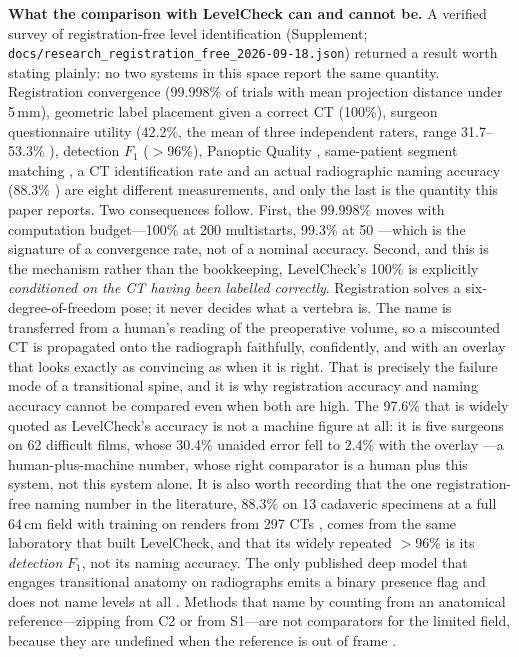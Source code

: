 \documentclass[11pt,letterpaper]{article}
\begin{document}
\textbf{What the comparison with LevelCheck can and cannot be.} A verified survey of registration-free level identification (Supplement; \texttt{docs/research\_registration\_free\_2026-09-18.json}) returned a result worth stating plainly: no two systems in this space report the same quantity. Registration convergence (99.998\% of trials with mean projection distance under 5\,mm), geometric label placement given a correct CT (100\%), surgeon questionnaire utility (42.2\%, the mean of three independent raters, range 31.7--53.3\% \citep{desilva2016}), detection $F_1$ ($>$96\%), Panoptic Quality \citep{vertxnet2024}, same-patient segment matching \citep{vdvm2023}, a CT identification rate \citep{spineclue2024} and an actual radiographic naming accuracy (88.3\% \citep{huang2022}) are eight different measurements, and only the last is the quantity this paper reports. Two consequences follow. First, the 99.998\% moves with computation budget---100\% at 200 multistarts, 99.3\% at 50 \citep{otake2015}---which is the signature of a convergence rate, not of a nominal accuracy. Second, and this is the mechanism rather than the bookkeeping, LevelCheck's 100\% is explicitly \emph{conditioned on the CT having been labelled correctly}. Registration solves a six-degree-of-freedom pose; it never decides what a vertebra is. The name is transferred from a human's reading of the preoperative volume, so a miscounted CT is propagated onto the radiograph faithfully, confidently, and with an overlay that looks exactly as convincing as when it is right. That is precisely the failure mode of a transitional spine, and it is why registration accuracy and naming accuracy cannot be compared even when both are high. The 97.6\% that is widely quoted as LevelCheck's accuracy is not a machine figure at all: it is five surgeons on 62 difficult films, whose 30.4\% unaided error fell to 2.4\% with the overlay \citep{manbachi2018}---a human-plus-machine number, whose right comparator is a human plus this system, not this system alone. It is also worth recording that the one registration-free naming number in the literature, 88.3\% on 13 cadaveric specimens at a full 64\,cm field with training on renders from 297 CTs \citep{huang2022}, comes from the same laboratory that built LevelCheck, and that its widely repeated $>$96\% is its \emph{detection} $F_1$, not its naming accuracy. The only published deep model that engages transitional anatomy on radiographs emits a binary presence flag and does not name levels at all \citep{kwak2025}. Methods that name by counting from an anatomical reference---zipping from C2 or from S1---are not comparators for the limited field, because they are undefined when the reference is out of frame \citep{vertxnet2024}.
\end{document}

